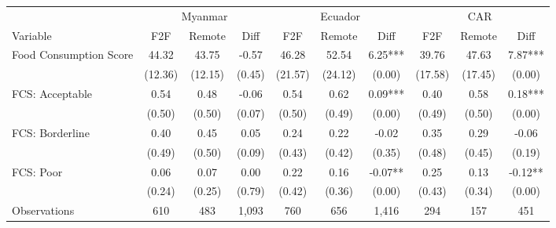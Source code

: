 \begin{tabular}{l*{9}c}
\hline\hline
 & \multicolumn{3}{c}{Myanmar} & \multicolumn{3}{c}{Ecuador} & \multicolumn{3}{c}{CAR}\\ 
Variable & F2F & Remote & Diff & F2F & Remote & Diff & F2F & Remote & Diff \\
\hline
Food Consumption Score&44.32&43.75&-0.57&46.28&52.54&6.25***&39.76&47.63&7.87***\\
&(12.36)&(12.15)&(0.45)&(21.57)&(24.12)&(0.00)&(17.58)&(17.45)&(0.00)\\
FCS: Acceptable&0.54&0.48&-0.06&0.54&0.62&0.09***&0.40&0.58&0.18***\\
&(0.50)&(0.50)&(0.07)&(0.50)&(0.49)&(0.00)&(0.49)&(0.50)&(0.00)\\
FCS: Borderline&0.40&0.45&0.05&0.24&0.22&-0.02&0.35&0.29&-0.06\\
&(0.49)&(0.50)&(0.09)&(0.43)&(0.42)&(0.35)&(0.48)&(0.45)&(0.19)\\
FCS: Poor&0.06&0.07&0.00&0.22&0.16&-0.07**&0.25&0.13&-0.12**\\
&(0.24)&(0.25)&(0.79)&(0.42)&(0.36)&(0.00)&(0.43)&(0.34)&(0.00)\\
\hline
Observations & 610 & 483 & 1,093 & 760 & 656 & 1,416 & 294 & 157 & 451 \\
\hline\hline
\end{tabular}
